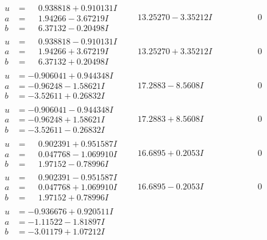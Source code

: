 \documentclass[1p]{elsarticle_modified}
\theoremstyle{definition}
\begin{document}
$$\begin{array}{c|c|c}
\begin{aligned}
u &= \phantom{-}0.938818 + 0.910131 I \\
a &= \phantom{-}1.94266 - 3.67219 I \\
b &= \phantom{-}6.37132 - 0.20498 I\end{aligned}
 & \phantom{-}13.25270 - 3.35212 I & \phantom{-0.000000 } 0 \\ \hline\begin{aligned}
u &= \phantom{-}0.938818 - 0.910131 I \\
a &= \phantom{-}1.94266 + 3.67219 I \\
b &= \phantom{-}6.37132 + 0.20498 I\end{aligned}
 & \phantom{-}13.25270 + 3.35212 I & \phantom{-0.000000 } 0 \\ \hline\begin{aligned}
u &= -0.906041 + 0.944348 I \\
a &= -0.96248 - 1.58621 I \\
b &= -3.52611 + 0.26832 I\end{aligned}
 & \phantom{-}17.2883 - 8.5608 I & \phantom{-0.000000 } 0 \\ \hline\begin{aligned}
u &= -0.906041 - 0.944348 I \\
a &= -0.96248 + 1.58621 I \\
b &= -3.52611 - 0.26832 I\end{aligned}
 & \phantom{-}17.2883 + 8.5608 I & \phantom{-0.000000 } 0 \\ \hline\begin{aligned}
u &= \phantom{-}0.902391 + 0.951587 I \\
a &= \phantom{-}0.047768 - 1.069910 I \\
b &= \phantom{-}1.97152 - 0.78996 I\end{aligned}
 & \phantom{-}16.6895 + 0.2053 I & \phantom{-0.000000 } 0 \\ \hline\begin{aligned}
u &= \phantom{-}0.902391 - 0.951587 I \\
a &= \phantom{-}0.047768 + 1.069910 I \\
b &= \phantom{-}1.97152 + 0.78996 I\end{aligned}
 & \phantom{-}16.6895 - 0.2053 I & \phantom{-0.000000 } 0 \\ \hline\begin{aligned}
u &= -0.936676 + 0.920511 I \\
a &= -1.11522 - 1.81897 I \\
b &= -3.01179 + 1.07212 I\end{aligned}

\end{array}$$
\end{document}
